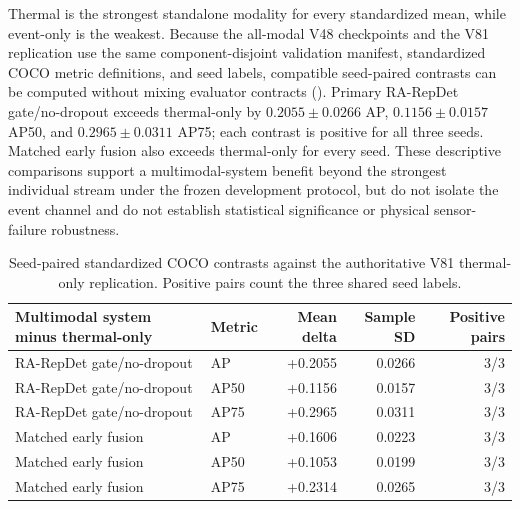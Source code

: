 Thermal is the strongest standalone modality for every standardized mean, while event-only is the weakest. Because the all-modal V48 checkpoints and the V81 replication use the same component-disjoint validation manifest, standardized COCO metric definitions, and seed labels, compatible seed-paired contrasts can be computed without mixing evaluator contracts (). Primary RA-RepDet gate/no-dropout exceeds thermal-only by $0.2055\pm0.0266$ AP, $0.1156\pm0.0157$ AP50, and $0.2965\pm0.0311$ AP75; each contrast is positive for all three seeds. Matched early fusion also exceeds thermal-only for every seed. These descriptive comparisons support a multimodal-system benefit beyond the strongest individual stream under the frozen development protocol, but do not isolate the event channel and do not establish statistical significance or physical sensor-failure robustness.

\begin{table}[t]
\centering
\caption{Seed-paired standardized COCO contrasts against the authoritative V81 thermal-only replication. Positive pairs count the three shared seed labels.}
\label{tab:fusion-over-v81-thermal}
\scriptsize
\begin{tabular}{@{}llrrr@{}}
\toprule
Multimodal system minus thermal-only & Metric & Mean delta & Sample SD & Positive pairs\\
\midrule
RA-RepDet gate/no-dropout & AP & +0.2055 & 0.0266 & 3/3\\
RA-RepDet gate/no-dropout & AP50 & +0.1156 & 0.0157 & 3/3\\
RA-RepDet gate/no-dropout & AP75 & +0.2965 & 0.0311 & 3/3\\
Matched early fusion & AP & +0.1606 & 0.0223 & 3/3\\
Matched early fusion & AP50 & +0.1053 & 0.0199 & 3/3\\
Matched early fusion & AP75 & +0.2314 & 0.0265 & 3/3\\
\bottomrule
\end{tabular}
\end{table}

